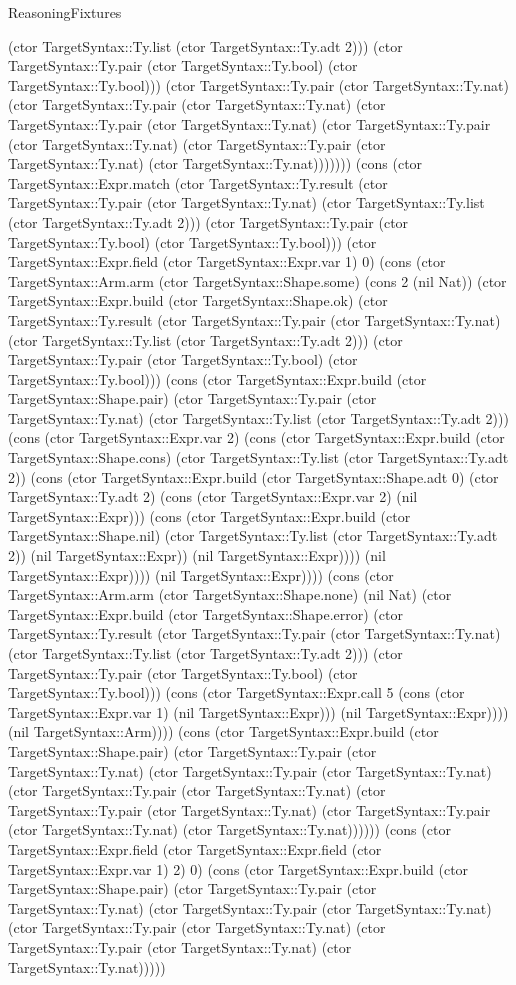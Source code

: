 \begin{lexlean}{ReasoningFixtures}
\begin{semanticmodule}
{(ctor TargetSyntax::Ty.list (ctor TargetSyntax::Ty.adt 2))) (ctor TargetSyntax::Ty.pair (ctor TargetSyntax::Ty.bool) (ctor TargetSyntax::Ty.bool))) (ctor TargetSyntax::Ty.pair (ctor TargetSyntax::Ty.nat) (ctor TargetSyntax::Ty.pair (ctor TargetSyntax::Ty.nat) (ctor TargetSyntax::Ty.pair (ctor TargetSyntax::Ty.nat) (ctor TargetSyntax::Ty.pair (ctor TargetSyntax::Ty.nat) (ctor TargetSyntax::Ty.pair (ctor TargetSyntax::Ty.nat) (ctor TargetSyntax::Ty.nat))))))) (cons (ctor TargetSyntax::Expr.match (ctor TargetSyntax::Ty.result (ctor TargetSyntax::Ty.pair (ctor TargetSyntax::Ty.nat) (ctor TargetSyntax::Ty.list (ctor TargetSyntax::Ty.adt 2))) (ctor TargetSyntax::Ty.pair (ctor TargetSyntax::Ty.bool) (ctor TargetSyntax::Ty.bool))) (ctor TargetSyntax::Expr.field (ctor TargetSyntax::Expr.var 1) 0) (cons (ctor TargetSyntax::Arm.arm (ctor TargetSyntax::Shape.some) (cons 2 (nil Nat)) (ctor TargetSyntax::Expr.build (ctor TargetSyntax::Shape.ok) (ctor TargetSyntax::Ty.result (ctor TargetSyntax::Ty.pair (ctor TargetSyntax::Ty.nat) (ctor TargetSyntax::Ty.list (ctor TargetSyntax::Ty.adt 2))) (ctor TargetSyntax::Ty.pair (ctor TargetSyntax::Ty.bool) (ctor TargetSyntax::Ty.bool))) (cons (ctor TargetSyntax::Expr.build (ctor TargetSyntax::Shape.pair) (ctor TargetSyntax::Ty.pair (ctor TargetSyntax::Ty.nat) (ctor TargetSyntax::Ty.list (ctor TargetSyntax::Ty.adt 2))) (cons (ctor TargetSyntax::Expr.var 2) (cons (ctor TargetSyntax::Expr.build (ctor TargetSyntax::Shape.cons) (ctor TargetSyntax::Ty.list (ctor TargetSyntax::Ty.adt 2)) (cons (ctor TargetSyntax::Expr.build (ctor TargetSyntax::Shape.adt 0) (ctor TargetSyntax::Ty.adt 2) (cons (ctor TargetSyntax::Expr.var 2) (nil TargetSyntax::Expr))) (cons (ctor TargetSyntax::Expr.build (ctor TargetSyntax::Shape.nil) (ctor TargetSyntax::Ty.list (ctor TargetSyntax::Ty.adt 2)) (nil TargetSyntax::Expr)) (nil TargetSyntax::Expr)))) (nil TargetSyntax::Expr)))) (nil TargetSyntax::Expr)))) (cons (ctor TargetSyntax::Arm.arm (ctor TargetSyntax::Shape.none) (nil Nat) (ctor TargetSyntax::Expr.build (ctor TargetSyntax::Shape.error) (ctor TargetSyntax::Ty.result (ctor TargetSyntax::Ty.pair (ctor TargetSyntax::Ty.nat) (ctor TargetSyntax::Ty.list (ctor TargetSyntax::Ty.adt 2))) (ctor TargetSyntax::Ty.pair (ctor TargetSyntax::Ty.bool) (ctor TargetSyntax::Ty.bool))) (cons (ctor TargetSyntax::Expr.call 5 (cons (ctor TargetSyntax::Expr.var 1) (nil TargetSyntax::Expr))) (nil TargetSyntax::Expr)))) (nil TargetSyntax::Arm)))) (cons (ctor TargetSyntax::Expr.build (ctor TargetSyntax::Shape.pair) (ctor TargetSyntax::Ty.pair (ctor TargetSyntax::Ty.nat) (ctor TargetSyntax::Ty.pair (ctor TargetSyntax::Ty.nat) (ctor TargetSyntax::Ty.pair (ctor TargetSyntax::Ty.nat) (ctor TargetSyntax::Ty.pair (ctor TargetSyntax::Ty.nat) (ctor TargetSyntax::Ty.pair (ctor TargetSyntax::Ty.nat) (ctor TargetSyntax::Ty.nat)))))) (cons (ctor TargetSyntax::Expr.field (ctor TargetSyntax::Expr.field (ctor TargetSyntax::Expr.var 1) 2) 0) (cons (ctor TargetSyntax::Expr.build (ctor TargetSyntax::Shape.pair) (ctor TargetSyntax::Ty.pair (ctor TargetSyntax::Ty.nat) (ctor TargetSyntax::Ty.pair (ctor TargetSyntax::Ty.nat) (ctor TargetSyntax::Ty.pair (ctor TargetSyntax::Ty.nat) (ctor TargetSyntax::Ty.pair (ctor TargetSyntax::Ty.nat) (ctor TargetSyntax::Ty.nat))))) }
\end{semanticmodule}
\end{lexlean}
